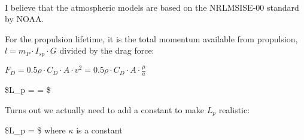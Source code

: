 \documentclass[11pt]{article}
\begin{document}
    \begin{center}
    \end{center}
    { \hspace*{\fill} \\}
    
    I believe that the atmospheric models are based on the NRLMSISE-00
standard by NOAA.

    For the propulsion lifetime, it is the total momentum available from
propulsion, \(l=m_P \cdot I_{sp} \cdot G\) divided by the drag force:

\(F_D = 0.5 \rho \cdot C_D \cdot A \cdot v^2 = 0.5 \rho \cdot C_D \cdot A \cdot \frac{\mu}{a}\)

\$L\_p =  =
\$

Turns out we actually need to add a constant to make \(L_p\) realistic:

\$L\_p =
\kappa {}
\$ where \(\kappa\) is a constant
\end{document}
